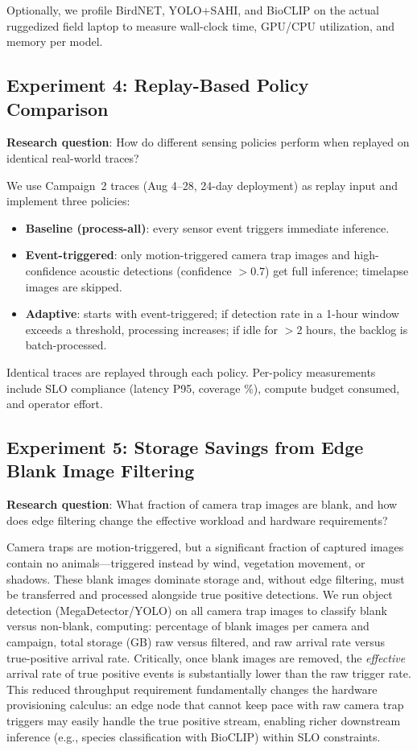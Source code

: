\documentclass[letterpaper,twocolumn,10pt]{article}
\begin{document}
Optionally, we profile BirdNET, YOLO+SAHI, and BioCLIP on the actual ruggedized field laptop to measure wall-clock time, GPU/CPU utilization, and memory per model.

\subsection{Experiment 4: Replay-Based Policy Comparison}
\label{sec:exp4}

\textbf{Research question}: How do different sensing policies perform when replayed on identical real-world traces?

We use Campaign~2 traces (Aug 4--28, 24-day deployment) as replay input and implement three policies:
\begin{itemize}
    \item \textbf{Baseline (process-all)}: every sensor event triggers immediate inference.
    \item \textbf{Event-triggered}: only motion-triggered camera trap images and high-confidence acoustic detections (confidence $> 0.7$) get full inference; timelapse images are skipped.
    \item \textbf{Adaptive}: starts with event-triggered; if detection rate in a 1-hour window exceeds a threshold, processing increases; if idle for $>$2 hours, the backlog is batch-processed.
\end{itemize}
Identical traces are replayed through each policy. Per-policy measurements include SLO compliance (latency P95, coverage \%), compute budget consumed, and operator effort.

\subsection{Experiment 5: Storage Savings from Edge Blank Image Filtering}
\label{sec:exp5}

\textbf{Research question}: What fraction of camera trap images are blank, and how does edge filtering change the effective workload and hardware requirements?

Camera traps are motion-triggered, but a significant fraction of captured images contain no animals---triggered instead by wind, vegetation movement, or shadows. These blank images dominate storage and, without edge filtering, must be transferred and processed alongside true positive detections. We run object detection (MegaDetector/YOLO) on all camera trap images to classify blank versus non-blank, computing: percentage of blank images per camera and campaign, total storage (GB) raw versus filtered, and raw arrival rate versus true-positive arrival rate. Critically, once blank images are removed, the \textit{effective} arrival rate of true positive events is substantially lower than the raw trigger rate. This reduced throughput requirement fundamentally changes the hardware provisioning calculus: an edge node that cannot keep pace with raw camera trap triggers may easily handle the true positive stream, enabling richer downstream inference (e.g., species classification with BioCLIP) within SLO constraints.
\end{document}
